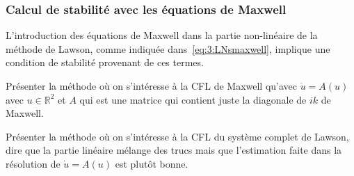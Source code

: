 
\subsubsection{Calcul de stabilité avec les équations de Maxwell}

L'introduction des équations de Maxwell dans la partie non-linéaire de la méthode de Lawson, comme indiquée dans~\eqref{eq:3:LNsmaxwell}, implique une condition de stabilité provenant de ces termes.

Présenter la méthode où on s'intéresse à la CFL de Maxwell qu'avec $\dot{u} = A(u)$ avec $u\in\mathbb{R}^2$ et $A$ qui est une matrice qui contient juste la diagonale de $ik$ de Maxwell.

Présenter la méthode où on s'intéresse à la CFL du système complet de Lawson, dire que la partie linéaire mélange des trucs mais que l'estimation faite dans la résolution de $\dot{u} = A(u)$ est plutôt bonne.

